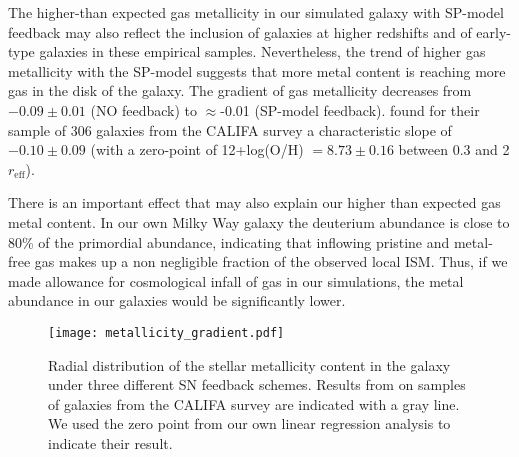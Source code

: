 \documentclass[iop]{emulateapj}
\begin{document}
The higher-than expected gas metallicity in our simulated galaxy with SP-model feedback may also reflect the inclusion of galaxies at higher redshifts and of early-type galaxies in these empirical samples. Nevertheless, the trend of higher gas metallicity with the SP-model suggests that more metal content is reaching more gas in the disk of the galaxy. The gradient of gas metallicity decreases from $-0.09\pm0.01$ (NO feedback) to $\approx$-0.01 (SP-model feedback). \citet{Sanchez2014} found for their sample of 306 galaxies from the CALIFA survey a characteristic slope of $-0.10\pm0.09$ (with a zero-point of 12+log(O/H) $=8.73\pm0.16$ between 0.3 and 2 $r_{\mathrm{eff}}$).

There is an important effect that may also explain our higher than expected gas metal content. In our own Milky Way galaxy the deuterium abundance is close to 80\% of the primordial abundance, indicating that inflowing pristine and metal-free gas makes up a non negligible fraction of the observed local ISM. Thus, if we made allowance for cosmological infall of gas in our simulations, the metal abundance in our galaxies would be significantly lower.

\begin{figure}
\texttt{[image: metallicity\_gradient.pdf]}
\caption{Radial distribution of the stellar metallicity content in the galaxy under three different SN feedback schemes. Results from \citet{Sanchez-Blazquez2014} on samples of galaxies from the CALIFA survey are indicated with a gray line. We used the zero point from our own linear regression analysis to indicate their result.}
\label{fig:Metals}
\end{figure}
\end{document}
